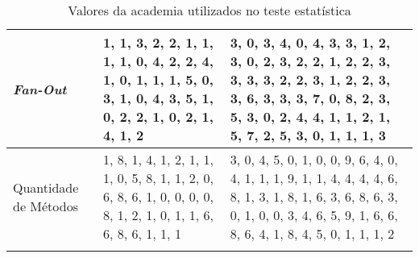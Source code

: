 \begin{longtable}{| p{2cm} | p{6.5cm} | p{6.5cm} | }
		\hline
		
		\textit{Fan-Out} &	
		1, 1, 3, 2, 2, 1, 1, 1, 1, 0, 4, 2, 2, 4, 1, 0, 1, 1, 1, 5, 0, 3, 1, 0, 4, 3, 5, 1, 0, 2, 2, 1, 0, 2, 1, 4, 1, 2 &	
		
		3, 0, 3, 4, 0, 4, 3, 3, 1, 2, 3, 0, 2, 3, 2, 2, 1, 2, 2, 3, 3, 3, 3, 2, 2, 3, 1, 2, 2, 3, 3, 6, 3, 3, 3, 7, 0, 8, 2, 3, 5, 3, 0, 2, 4, 4, 1, 1, 2, 1, 5, 7, 2, 5, 3, 0, 1, 1, 1, 3\\
		
				\hline
				
		Quantidade de Métodos &	1, 8, 1, 4, 1, 2, 1, 1, 1, 0, 5, 8, 1, 1, 2, 0, 6, 8, 6, 1, 0, 0, 0, 0, 8, 1, 2, 1, 0, 1, 1, 6, 6, 8, 6, 1, 1, 1 &	
		3, 0, 4, 5, 0, 1, 0, 0, 9, 6, 4, 0, 4, 1, 1, 1, 9, 1, 1, 4, 4, 4, 4, 6, 8, 1, 3, 1, 8, 1, 6, 3, 6, 8, 6, 3, 0, 1, 0, 0, 3, 4, 6, 5, 9, 1, 6, 6, 8, 6, 4, 1, 8, 4, 5, 0, 1, 1, 1, 2\\
		
		\hline
	\caption{Valores da academia utilizados no teste estatística}
	\label{tab:valores-academia}
\end{longtable}

